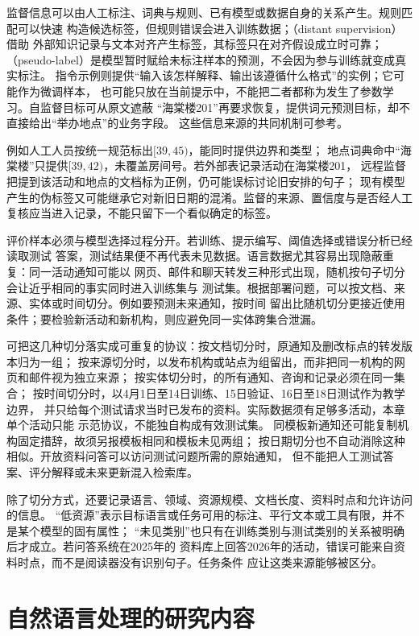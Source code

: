 监督信息可以由人工标注、词典与规则、已有模型或数据自身的关系产生。规则匹配可以快速
构造候选标签，但规则错误会进入训练数据；（distant supervision）借助
外部知识记录与文本对齐产生标签，其标签只在对齐假设成立时可靠；
（pseudo-label）是模型暂时赋给未标注样本的预测，不会因为参与训练就变成真实标注。
指令示例则提供“输入该怎样解释、输出该遵循什么格式”的实例；它可能作为微调样本，
也可能只放在当前提示中，不能把二者都称为发生了参数学习。自监督目标可从原文遮蔽
“海棠楼201”再要求恢复，提供词元预测目标，却不直接给出“举办地点”的业务字段。
这些信息来源的共同机制可参考。

例如人工人员按统一规范标出$[39,45)$，能同时提供边界和类型；
地点词典命中“海棠楼”只提供$[39,42)$，未覆盖房间号。若外部表记录活动在海棠楼201，
远程监督把提到该活动和地点的文档标为正例，仍可能误标讨论旧安排的句子；
现有模型产生的伪标签又可能继承它对新旧日期的混淆。监督的来源、置信度与是否经人工
复核应当进入记录，不能只留下一个看似确定的标签。

评价样本必须与模型选择过程分开。若训练、提示编写、阈值选择或错误分析已经读取测试
答案，测试结果便不再代表未见数据。语言数据尤其容易出现隐蔽重复：同一活动通知可能以
网页、邮件和聊天转发三种形式出现，随机按句子切分会让近乎相同的事实同时进入训练集与
测试集。根据部署问题，可以按文档、来源、实体或时间切分。例如要预测未来通知，按时间
留出比随机切分更接近使用条件；要检验新活动和新机构，则应避免同一实体跨集合泄漏。

可把这几种切分落实成可重复的协议：按文档切分时，原通知及删改标点的转发版本归为一组；
按来源切分时，以发布机构或站点为组留出，而非把同一机构的网页和邮件视为独立来源；
按实体切分时，的所有通知、咨询和记录必须在同一集合；
按时间切分时，以4月1日至14日训练、15日验证、16日至18日测试作为教学边界，
并只给每个测试请求当时已发布的资料。实际数据须有足够多活动，本章单个活动只能
示范协议，不能独自构成有效测试集。
同模板新通知还可能复制机构固定措辞，故须另报模板相同和模板未见两组；
按日期切分也不自动消除这种相似。开放资料问答可以访问测试问题所需的原始通知，
但不能把人工测试答案、评分解释或未来更新混入检索库。

除了切分方式，还要记录语言、领域、资源规模、文档长度、资料时点和允许访问的信息。
“低资源”表示目标语言或任务可用的标注、平行文本或工具有限，并不是某个模型的固有属性；
“未见类别”也只有在训练类别与测试类别的关系被明确后才成立。若问答系统在2025年的
资料库上回答2026年的活动，错误可能来自资料时点，而不是阅读器没有识别句子。任务条件
应让这类来源能够被区分。

\section{自然语言处理的研究内容}
\label{sec:nlp-research-content}

